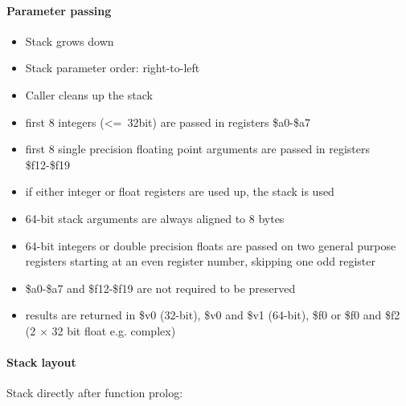 \paragraph{Parameter passing}

\begin{itemize}
\item Stack grows down
\item Stack parameter order: right-to-left
\item Caller cleans up the stack
\item first 8 integers (\textless=\ 32bit) are passed in registers \$a0-\$a7
\item first 8 single precision floating point arguments are passed in registers \$f12-\$f19
\item if either integer or float registers are used up, the stack is used
\item 64-bit stack arguments are always aligned to 8 bytes
\item 64-bit integers or double precision floats are passed on two general purpose registers starting at an even register number, skipping one odd register
\item \$a0-\$a7 and \$f12-\$f19 are not required to be preserved
\item results are returned in \$v0 (32-bit), \$v0 and \$v1 (64-bit), \$f0 or \$f0 and \$f2 (2 $\times$ 32 bit float e.g. complex)
\end{itemize}

\paragraph{Stack layout}

Stack directly after function prolog:\\

